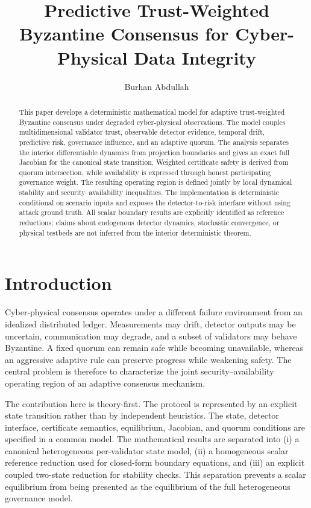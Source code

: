 \documentclass[10pt,journal]{IEEEtran}
\title{Predictive Trust-Weighted Byzantine Consensus for Cyber-Physical Data Integrity}
\author{Burhan Abdullah}
\begin{document}
\maketitle

\begin{abstract}
This paper develops a deterministic mathematical model for adaptive trust-weighted Byzantine consensus under degraded cyber-physical observations. The model couples multidimensional validator trust, observable detector evidence, temporal drift, predictive risk, governance influence, and an adaptive quorum. The analysis separates the interior differentiable dynamics from projection boundaries and gives an exact full Jacobian for the canonical state transition. Weighted certificate safety is derived from quorum intersection, while availability is expressed through honest participating governance weight. The resulting operating region is defined jointly by local dynamical stability and security--availability inequalities. The implementation is deterministic conditional on scenario inputs and exposes the detector-to-risk interface without using attack ground truth. All scalar boundary results are explicitly identified as reference reductions; claims about endogenous detector dynamics, stochastic convergence, or physical testbeds are not inferred from the interior deterministic theorem.
\end{abstract}

\section{Introduction}
Cyber-physical consensus operates under a different failure environment from an idealized distributed ledger. Measurements may drift, detector outputs may be uncertain, communication may degrade, and a subset of validators may behave Byzantine. A fixed quorum can remain safe while becoming unavailable, whereas an aggressive adaptive rule can preserve progress while weakening safety. The central problem is therefore to characterize the joint security--availability operating region of an adaptive consensus mechanism.

The contribution here is theory-first. The protocol is represented by an explicit state transition rather than by independent heuristics. The state, detector interface, certificate semantics, equilibrium, Jacobian, and quorum conditions are specified in a common model. The mathematical results are separated into (i) a canonical heterogeneous per-validator state model, (ii) a homogeneous scalar reference reduction used for closed-form boundary equations, and (iii) an explicit coupled two-state reduction for stability checks. This separation prevents a scalar equilibrium from being presented as the equilibrium of the full heterogeneous governance model.
\end{document}

